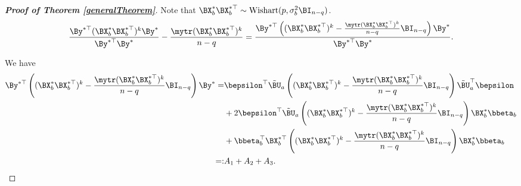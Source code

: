 


\begin{proof}[\textbf{Proof of Theorem \ref{generalTheorem}}]
    Note that $\BX_b^* \BX_b^{*\top} \sim \text{Wishart}(p,\sigma_b^2 \BI_{n-q})$.
    \begin{equation*}
        \frac{\By^{*\top} (\BX_b^* \BX_b^{*\top})^{k} \By^*}{\By^{*\top} \By^*} -\frac{\mytr (\BX_b^* \BX_b^{*\top})^{k}}{n-q}
        =
        \frac{\By^{*\top}\left( (\BX_b^* \BX_b^{*\top})^{k} 
                -\frac{\mytr  (\BX_b^* \BX_b^{*\top})^{k}}{n-q} 
                \BI_{n-q}
        \right) \By^*}{\By^{*\top} \By^*}.
    \end{equation*}

We have
\begin{align*}
\By^{*\top}\left( (\BX_b^* \BX_b^{*\top})^{k} 
    -\frac{\mytr  (\BX_b^* \BX_b^{*\top})^{k}}{n-q} 
                \BI_{n-q}
        \right) \By^*
        =&
\bepsilon^{\top} \tilde \BU_a \left( (\BX_b^* \BX_b^{*\top})^{k} 
    -\frac{\mytr  (\BX_b^* \BX_b^{*\top})^{k}}{n-q} 
                \BI_{n-q}
        \right) \tilde \BU_a^\top \bepsilon
        \\
        &+
        2\bepsilon^{\top} \tilde \BU_a \left( (\BX_b^* \BX_b^{*\top})^{k} 
            -\frac{\mytr  (\BX_b^* \BX_b^{*\top})^{k}}{n-q} 
                \BI_{n-q}
            \right)  \BX_b^* \bbeta_b
        \\
        &+
 \bbeta_b^\top
 \BX_b^{*\top}
 \left( (\BX_b^* \BX_b^{*\top})^{k} 
     -\frac{\mytr  (\BX_b^* \BX_b^{*\top})^{k}}{n-q} 
                \BI_{n-q}
            \right)  \BX_b^* \bbeta_b
            \\
            =:&
            A_1+ A_2 +A_3
            .
\end{align*}



\end{proof}
